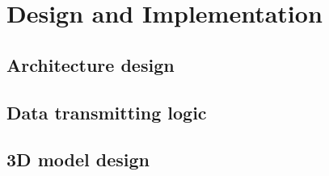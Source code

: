 

\chapter{Design and Implementation}

\section{Architecture design}

\section{Data transmitting logic}

\section{3D model design}